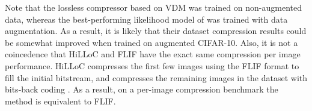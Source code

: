 \documentclass{article} \usepackage{iclr2022_conference,times}
\begin{document}
\begin{table}
    \centering
    \caption{CIFAR-10 lossless compression performance (in bpd).}
    \vspace{-.3cm}
    \label{tab:cifar10_compression_results}
    \vspace{-.3cm}
\end{table}

Note that the lossless compressor based on VDM was trained on non-augmented data, whereas the best-performing likelihood model of \citet{kingma2021vdm} was trained with data augmentation. As a result, it is likely that their dataset compression results could be somewhat improved when trained on augmented CIFAR-10. Also, it is not a coincedence that HiLLoC and FLIF have the exact same compression per image performance. HiLLoC compresses the first few images using the FLIF format to fill the initial bitstream, and compresses the remaining images in the dataset with bits-back coding \citep{townsend2020hilloc}. As a result, on a per-image compression benchmark the method is equivalent to FLIF. 
\end{document}
